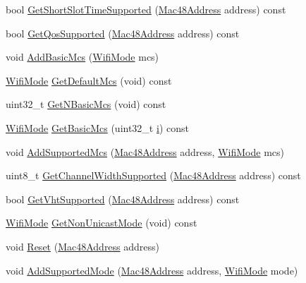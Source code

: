 \begin{DoxyCompactItemize}
\item 
bool \hyperlink{classns3_1_1WifiRemoteStationManager_a62ea37f7c34915c72a51cfcde22ea4ae}{Get\+Short\+Slot\+Time\+Supported} (\hyperlink{classns3_1_1Mac48Address}{Mac48\+Address} address) const 
\item 
bool \hyperlink{classns3_1_1WifiRemoteStationManager_aee39e3617762c83709a7a88a7bfad318}{Get\+Qos\+Supported} (\hyperlink{classns3_1_1Mac48Address}{Mac48\+Address} address) const 
\item 
void \hyperlink{classns3_1_1WifiRemoteStationManager_a6902286b2f6e4b0f269520357d92bace}{Add\+Basic\+Mcs} (\hyperlink{classns3_1_1WifiMode}{Wifi\+Mode} mcs)
\item 
\hyperlink{classns3_1_1WifiMode}{Wifi\+Mode} \hyperlink{classns3_1_1WifiRemoteStationManager_ac088d1a4943d51a3fa0a9fbf42fdf961}{Get\+Default\+Mcs} (void) const 
\item 
uint32\+\_\+t \hyperlink{classns3_1_1WifiRemoteStationManager_a0a421b0b492b65ca21919258085db4dd}{Get\+N\+Basic\+Mcs} (void) const 
\item 
\hyperlink{classns3_1_1WifiMode}{Wifi\+Mode} \hyperlink{classns3_1_1WifiRemoteStationManager_ad879e69f9470219a53c87de067bf2f40}{Get\+Basic\+Mcs} (uint32\+\_\+t \hyperlink{lte__uplink__power__control_8m_a6f6ccfcf58b31cb6412107d9d5281426}{i}) const 
\item 
void \hyperlink{classns3_1_1WifiRemoteStationManager_a4fd51c027afacdfa7225346d6d88c6b3}{Add\+Supported\+Mcs} (\hyperlink{classns3_1_1Mac48Address}{Mac48\+Address} address, \hyperlink{classns3_1_1WifiMode}{Wifi\+Mode} mcs)
\item 
uint8\+\_\+t \hyperlink{classns3_1_1WifiRemoteStationManager_a8e61df321e8e10b731dea83caafb0cce}{Get\+Channel\+Width\+Supported} (\hyperlink{classns3_1_1Mac48Address}{Mac48\+Address} address) const 
\item 
bool \hyperlink{classns3_1_1WifiRemoteStationManager_aecf5ed3203b9b55cd831696a08daa5fe}{Get\+Vht\+Supported} (\hyperlink{classns3_1_1Mac48Address}{Mac48\+Address} address) const 
\item 
\hyperlink{classns3_1_1WifiMode}{Wifi\+Mode} \hyperlink{classns3_1_1WifiRemoteStationManager_aafc2c1d9f4f8ee7763e298aec352e67b}{Get\+Non\+Unicast\+Mode} (void) const 
\item 
void \hyperlink{classns3_1_1WifiRemoteStationManager_af86b5a6762ddd264176af51442e7b3ed}{Reset} (\hyperlink{classns3_1_1Mac48Address}{Mac48\+Address} address)
\item 
void \hyperlink{classns3_1_1WifiRemoteStationManager_a90f4d6b042c2692493446d36a3de799f}{Add\+Supported\+Mode} (\hyperlink{classns3_1_1Mac48Address}{Mac48\+Address} address, \hyperlink{classns3_1_1WifiMode}{Wifi\+Mode} mode)

\end{DoxyCompactItemize}
